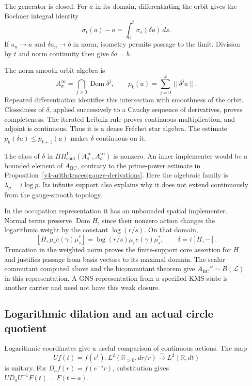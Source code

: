 The generator is closed. For $a$ in its domain, differentiating the orbit
gives the Bochner integral identity
\[
 \sigma_t(a)-a=\int_0^t\sigma_s(\delta a)\,ds.
\]
If $a_n\to a$ and $\delta a_n\to b$ in norm, isometry permits passage to the
limit. Division by $t$ and norm continuity then give $\delta a=b$.

The norm-smooth orbit algebra is
\[
 A_\sigma^\infty=\bigcap_{j\geq0}\operatorname{Dom}\delta^j,
 \qquad
 p_k(a)=\sum_{j=0}^k\|\delta^j a\|.
\]
Repeated differentiation identifies this intersection with smoothness of the
orbit. Closedness of $\delta$, applied successively to a Cauchy sequence of
derivatives, proves completeness. The iterated Leibniz rule proves
continuous multiplication, and adjoint is continuous. Thus it is a dense
Fr\'echet star algebra. The estimate $p_k(\delta a)\leq p_{k+1}(a)$ makes
$\delta$ continuous on it.

The class of $\delta$ in
$HH^1_{\mathrm{cont}}(A_\sigma^\infty,A_\sigma^\infty)$ is nonzero. An inner
implementer would be a bounded element of $A_{\mathrm{BC}}$, contrary to the
prime-power estimate in Proposition~\ref{v4-arith:traces:gauge-derivations}.
Here the algebraic family is $\lambda_p=i\log p$. Its infinite support also
explains why it does not extend continuously from the gauge-smooth topology.

In the occupation representation it has an unbounded spatial implementer.
Normal terms preserve $\operatorname{Dom}H$, since their nonzero action
changes the logarithmic weight by the constant $\log(r/s)$. On that domain,
\[
 [H,\mu_re(\gamma)\mu_s^*]
    =\log(r/s)\mu_re(\gamma)\mu_s^*,\qquad
 \delta=i[H,-].
\]
Truncation in the weighted norm proves the finite-support core assertion for
$H$ and justifies passage from basis vectors to its maximal domain. The
scalar commutant computed above and the bicommutant theorem give
$A_{\mathrm{BC}}''=B(\mathcal L)$ in this representation. A GNS
representation from a specified KMS state is another carrier and need not
have this weak closure.

\subsection{Logarithmic dilation and an actual circle quotient}

Logarithmic coordinates give a useful comparison of continuous actions. The
map
\[
 Uf(t)=f(e^t):L^2(\mathbb R_{>0},dr/r)
           \xrightarrow{\sim}L^2(\mathbb R,dt)
\]
is unitary. For $D_af(r)=f(e^{-a}r)$, substitution gives
$UD_aU^{-1}F(t)=F(t-a)$.

